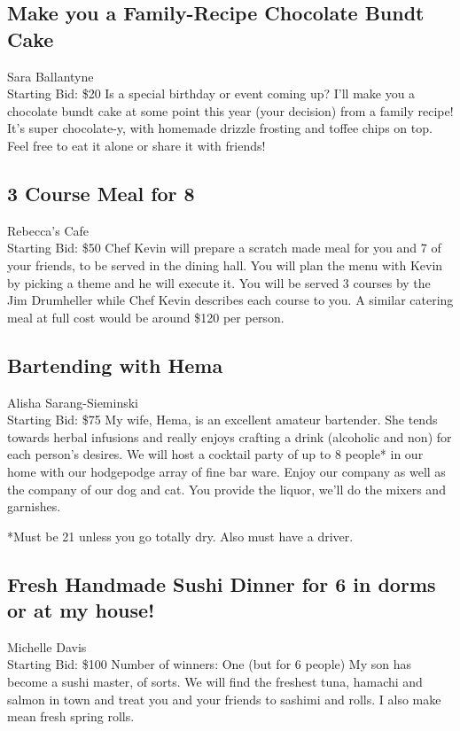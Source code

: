 \documentclass[11pt]{article}
\begin{document}
\subsection{Make you a Family-Recipe Chocolate Bundt Cake}
Sara Ballantyne
\\
Starting Bid: \$20
\newline
Is a special birthday or event coming up? I'll make you a chocolate bundt cake at some point this year (your decision) from a family recipe! It's super chocolate-y, with homemade drizzle frosting and toffee chips on top. Feel free to eat it alone or share it with friends!
\subsection{3 Course Meal for 8}
Rebecca's Cafe
\\
Starting Bid: \$50
\newline
Chef Kevin will prepare a scratch made meal for you and 7 of your friends, to be served in the dining hall. You will plan the menu with Kevin by picking a theme and he will execute it. You will be served 3 courses by the Jim Drumheller while Chef Kevin describes each course to you. A similar catering meal at full cost would be around \$120 per person.
\subsection{Bartending with Hema}
Alisha Sarang-Sieminski
\\
Starting Bid: \$75
\newline
My wife, Hema, is an excellent amateur bartender. She tends towards herbal infusions and really enjoys crafting a drink (alcoholic and non) for each person's desires. We will host a cocktail party of up to 8 people* in our home with our hodgepodge array of fine bar ware.  Enjoy our company as well as the company of our dog and cat. You provide the liquor, we'll do the mixers and garnishes.

*Must be 21 unless you go totally dry. Also must have a driver.
\subsection{Fresh Handmade Sushi Dinner for 6 in dorms or at my house!}
Michelle Davis
\\
Starting Bid: \$100
\newline
Number of winners: One (but for 6 people)
\newline
My son has become a sushi master, of sorts. We will find the freshest tuna, hamachi and salmon in town and treat you and your friends to sashimi and rolls. I also make mean fresh spring rolls.
\end{document}
